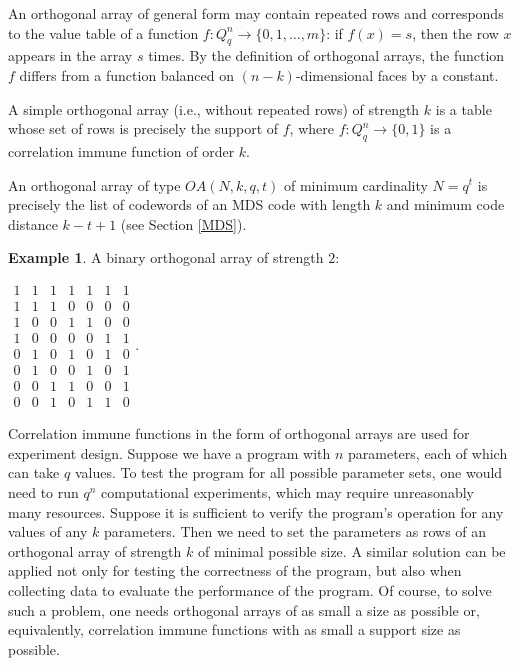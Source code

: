 \documentclass[11pt]{article}
\theoremstyle{definition}
\newtheorem{example}{Example}[section]
\begin{document}
{{{An orthogonal array of general form may contain repeated
rows and corresponds to the value table of a function $f:Q_q^n\rightarrow
\{0,1,\dots,m\}$: if $f(x)=s$, then the row $x$ appears in the array
$s$ times. By the definition of  orthogonal arrays, the function $f$ differs from a function balanced on
$(n-k)$-dimensional faces by a constant.

A simple orthogonal array   (i.e., without repeated rows) of strength $k$ is a table
whose set of rows is precisely the support of $f$,
where $f:Q_q^n\rightarrow \{0,1\}$
is a correlation immune function of order $k$.

An { orthogonal array}  of type $OA(N, k, q, t)$   of minimum cardinality $N=q^t$  is precisely the list of codewords of an MDS code with length $k$ and minimum code distance $k-t+1$ (see Section \ref{MDS}).



\begin{example}
A binary orthogonal array of strength $2$:

$\begin{array}{lllllll}
1& 1 &1 &1 &1 &1 & 1\\
1 &1 &1 &0 &0 &0 &0 \\
1 & 0 &0 &1 &1 & 0& 0 \\
1 &0 &0 &0 &0 &1 &1\\
0 &1& 0 &1 &0& 1 &0\\
0 & 1 &0 &0 &1 &0 &1\\
0 &0 &1 &1 &0 &0 &1\\
0 &0 &1 &0 &1 &1 &0
\end{array}.$
\end{example}

Correlation immune functions in the form of orthogonal arrays
are used for experiment design. Suppose we have a
program with $n$ parameters, each of which can take
$q$ values. To test the program for all
possible parameter sets, one would need to run $q^n$ computational
experiments, which may require unreasonably many resources.
Suppose it is sufficient  to verify the program's operation for any
values of any $k$ parameters. Then we need to set
the parameters as rows of an orthogonal array of strength $k$ of minimal
possible size. A similar solution can be applied not only
for testing the correctness of the program, but also when collecting
data to evaluate the performance of the program. Of course, to solve such a problem, one needs orthogonal arrays of as small a
size as possible or, equivalently, correlation immune functions with as
small a support size as possible.



}}}
\end{document}
